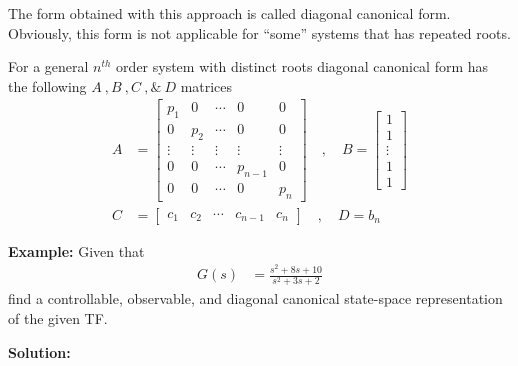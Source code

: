 \documentclass[twoside]{article}
\begin{document}
The form obtained with this approach is called
diagonal canonical form. Obviously, this form is
not applicable for ``some'' systems that has repeated roots.

For a general $n^{th}$ order system with distinct
roots diagonal canonical form has the following 
$A \ ,  B \ ,  C \ , \& \ D$ matrices
%
\begin{align*}
A &= \left[ \begin{array}{ccccc} p_1 & 0 & \cdots & 0 & 0
              \\ 0 & p_2 & \cdots & 0 & 0
\\ \vdots & \vdots & \vdots & \vdots & \vdots
\\ 0 & 0 & \cdots & p_{n-1} & 0
    \\ 0 & 0 & \cdots & 0 & p_n \end{array} \right]
\quad , \quad 
B = \left[ \begin{array}{c} 1 \\ 1 \\ \vdots \\ 1 \\  1
\end{array} \right]
\\ C &= \left[ \begin{array}{ccccc} c_1 & c_2 & \cdots &  c_{n-1} & c_n \end{array} \right]
\quad , \quad
D = b_n
\end{align*}

\newpage

\textbf{Example:} Given that
%
\begin{align*}
G(s) &= \frac{s^2 + 8 s + 10}{s^2 + 3 s + 2}
\end{align*}
%
find a controllable, observable, and  diagonal canonical state-space representation of the given TF.

\vspace{6pt}

\textbf{Solution:}
\end{document}
